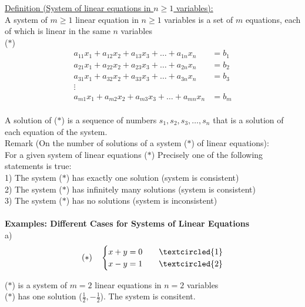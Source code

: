 \documentclass{jhwhw}
\begin{document}
\underline{Definition (System of linear equations in \(n \geq 1\) variables):}
\\

A system of \(m \geq 1\) linear equation in \(n \geq 1\) variables is a set of \(m\) equations, each of which is linear in the same \(n\) variables
\\

(\(\ast\)) \begin{align*} 
a_{11} x_1 + a_{12} x_2 + a_{13} x_3 + \ldots + a_{1n} x_n &= b_1\\
a_{21} x_1 + a_{22} x_2 + a_{23} x_3 + \ldots + a_{2n} x_n &= b_2\\
a_{31} x_1 + a_{32} x_2 + a_{33} x_3 + \ldots + a_{3n} x_n &= b_3\\
\vdots\\
a_{m1} x_1 + a_{m2} x_2 + a_{m3} x_3 + \ldots + a_{mn} x_n &= b_m
\end{align*}
\\

A solution of (\(\ast\)) is a sequence of numbers \(s_1, s_2, s_3, \ldots, s_n\) that is a solution of each equation of the system.
\\

Remark (On the number of solutions of a system (\(\ast\)) of linear equations):
\\

For a given system of linear equations (\(\ast\)) Precisely one of the following statements is true:
\\

1) The system (\(\ast\)) has exactly one solution (system is consistent) \\
2) The system (\(\ast\)) has infinitely many solutions (system is consistent) \\
3) The system (\(\ast\)) has no solutions (system is inconsistent) \\
\\

\textbf{Examples: Different Cases for Systems of Linear Equations}
\\

a) \begin{align*}
    (\ast) \quad \begin{cases}
        x+y=0 & \quad \textcircled{1} \\ x-y=1 & \quad \textcircled{2}
    \end{cases}
\end{align*}

(\(\ast\)) is a system of \(m =2 \) linear equations in \(n=2\) variables \\
(\(\ast\)) has one solution (\(\frac{1}{2}, -\frac{1}{2}\)). The system is consitent.
\\ \\
\end{document}
